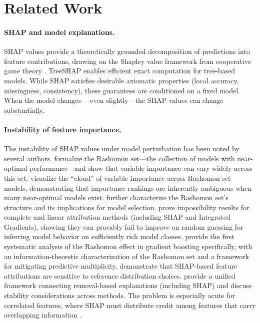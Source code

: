 \documentclass[10pt]{article}
\begin{document}
\section{Related Work}
\label{sec:related}

\paragraph{SHAP and model explanations.}
SHAP values \citep{lundberg2017unified} provide a theoretically grounded
decomposition of predictions into feature contributions, drawing on the
Shapley value framework from cooperative game theory
\citep{shapley1953value}. TreeSHAP \citep{lundberg2020local} enables
efficient exact computation for tree-based models. While SHAP satisfies
desirable axiomatic properties (local accuracy, missingness, consistency),
these guarantees are conditioned on a fixed model. When the model changes---
even slightly---the SHAP values can change substantially.

\paragraph{Instability of feature importance.}
The instability of SHAP values under model perturbation has been noted by
several authors. \citet{fisher2019all} formalize the Rashomon set---the
collection of models with near-optimal performance---and show that
variable importance can vary widely across this set.
\citet{dong2020exploring} visualize the ``cloud'' of variable importance
across Rashomon-set models, demonstrating that importance rankings are
inherently ambiguous when many near-optimal models exist.
\citet{semenova2022existence} further characterize the Rashomon set's
structure and its implications for model selection.
\citet{bilodeau2024impossibility} prove impossibility results for
complete and linear attribution methods (including SHAP and Integrated
Gradients), showing they can provably fail to improve on random guessing
for inferring model behavior on sufficiently rich model classes.
\citet{chenrashomongb2024} provide the first systematic analysis of the
Rashomon effect in gradient boosting specifically, with an
information-theoretic characterization of the Rashomon set and a framework
for mitigating predictive multiplicity.
\citet{marx2023but} demonstrate that SHAP-based feature attributions
are sensitive to reference distribution choices.
\citet{covert2021explaining} provide a unified framework connecting
removal-based explanations (including SHAP) and discuss stability
considerations across methods.
The problem is especially acute for correlated features, where SHAP must
distribute credit among features that carry overlapping information
\citep{kumar2020problems, chen2020true}.
\end{document}

